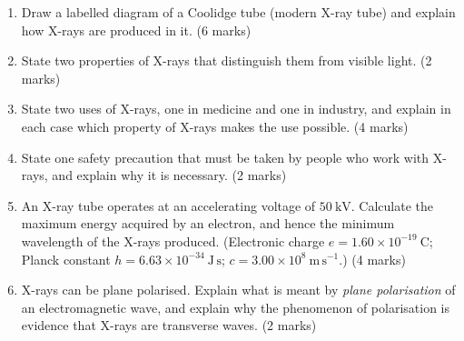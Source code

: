 \documentclass[11pt]{article}
\begin{document}
\begin{exercice}
\begin{enumerate}
\item Draw a labelled diagram of a Coolidge tube (modern X-ray tube) and explain how X-rays are produced in it. \hfill (6 marks)
\item State two properties of X-rays that distinguish them from visible light. \hfill (2 marks)
\item State two uses of X-rays, one in medicine and one in industry, and explain in each case which property of X-rays makes the use possible. \hfill (4 marks)
\item State one safety precaution that must be taken by people who work with X-rays, and explain why it is necessary. \hfill (2 marks)
\item An X-ray tube operates at an accelerating voltage of $50\ \mathrm{kV}$. Calculate the maximum energy acquired by an electron, and hence the minimum wavelength of the X-rays produced. (Electronic charge $e = 1.60\times10^{-19}\ \mathrm{C}$; Planck constant $h = 6.63\times10^{-34}\ \mathrm{J\,s}$; $c = 3.00\times10^{8}\ \mathrm{m\,s^{-1}}$.) \hfill (4 marks)
\item X-rays can be plane polarised. Explain what is meant by \emph{plane polarisation} of an electromagnetic wave, and explain why the phenomenon of polarisation is evidence that X-rays are transverse waves. \hfill (2 marks)
\end{enumerate}
\end{exercice}
\end{document}
